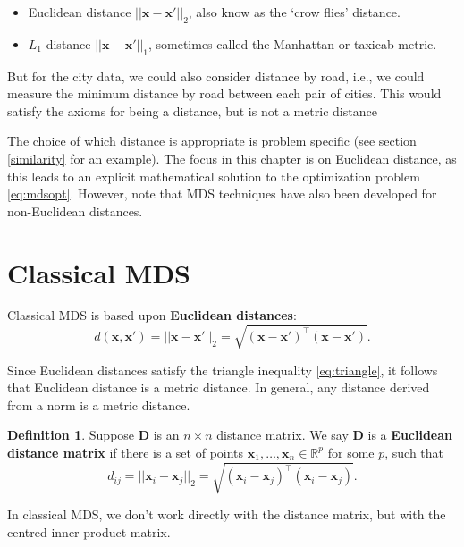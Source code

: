 \documentclass[
]{book}
\providecommand{\tightlist}{%
  \setlength{\itemsep}{0pt}\setlength{\parskip}{0pt}}
\theoremstyle{definition}
\newtheorem{definition}{Definition}[chapter]
\theoremstyle{definition}
\theoremstyle{definition}
\theoremstyle{definition}
\theoremstyle{remark}
\begin{document}
\begin{itemize}
\tightlist
\item
  Euclidean distance \(||\mathbf x-\mathbf x'||_2\), also know as the `crow flies' distance.
\item
  \(L_1\) distance \(||\mathbf x-\mathbf x'||_1\), sometimes called the Manhattan or taxicab metric.
\end{itemize}

But for the city data, we could also consider distance by road, i.e., we could measure the minimum distance by road between each pair of cities. This would satisfy the axioms for being a distance, but is not a metric distance

The choice of which distance is appropriate is problem specific (see section \ref{similarity} for an example). The focus in this chapter is on Euclidean distance, as this leads to an explicit mathematical solution to the optimization problem \eqref{eq:mdsopt}. However, note that MDS techniques have also been developed for non-Euclidean distances.

\section{Classical MDS}\label{classical-mds}

Classical MDS is based upon \textbf{Euclidean distances}:
\[d(\mathbf x, \mathbf x') = ||\mathbf x-\mathbf x'||_2 = \sqrt{(\mathbf x-\mathbf x')^\top (\mathbf x-\mathbf x')}.\]

Since Euclidean distances satisfy the triangle
inequality \eqref{eq:triangle}, it follows that Euclidean distance is a metric distance. In general, any distance derived from a norm is a metric distance.

\begin{definition}
\protect\hypertarget{def:euclideanD}{}\label{def:euclideanD}Suppose \(\mathbf D\) is an \(n\times n\) distance matrix. We say \(\mathbf D\) is a \textbf{Euclidean distance matrix}
if there is a set of points \(\mathbf x_1,\ldots , \mathbf x_n \in \mathbb{R}^p\) for some \(p\), such that
\[
d_{ij}=\vert \vert \mathbf x_i -\mathbf x_j \vert \vert_2 =\sqrt{(\mathbf x_i-\mathbf x_j)^\top (\mathbf x_i-\mathbf x_j)}.
\]
\end{definition}

In classical MDS, we don't work directly with the distance matrix, but with the centred inner product matrix.
\end{document}
